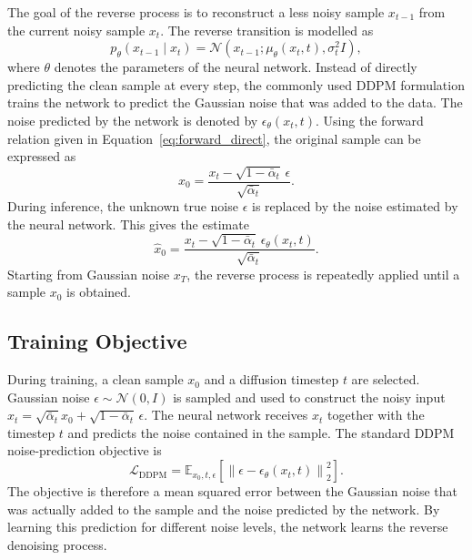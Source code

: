 \documentclass[english,ba]{tudo-sse-thesis}
\begin{document}
The goal of the reverse process is to reconstruct a less noisy sample
\(x_{t-1}\) from the current noisy sample \(x_t\). The reverse transition
is modelled as
\begin{equation}
    p_{\theta}(x_{t-1} \mid x_t)
    =
    \mathcal{N}
    \left(
        x_{t-1};
        \mu_{\theta}(x_t,t),
        \sigma_t^2 I
    \right),
\end{equation}
where \(\theta\) denotes the parameters of the neural network.
Instead of directly predicting the clean sample at every step, the
commonly used DDPM formulation trains the network to predict the Gaussian
noise that was added to the data. The noise predicted by the network is denoted by \(\epsilon_{\theta}(x_t,t)\). Using the forward relation given in
Equation~\ref{eq:forward_direct}, the original sample can be expressed as
\begin{equation}
    x_0
    =
    \frac{
        x_t
        -
        \sqrt{1-\bar{\alpha}_t}\,\epsilon
    }{
        \sqrt{\bar{\alpha}_t}
    }.
\end{equation}
During inference, the unknown true noise \(\epsilon\) is replaced by the
noise estimated by the neural network. This gives the estimate
\begin{equation}
    \hat{x}_0
    =
    \frac{
        x_t
        -
        \sqrt{1-\bar{\alpha}_t}
        \,\epsilon_{\theta}(x_t,t)
    }{
        \sqrt{\bar{\alpha}_t}
    }.
\end{equation}
Starting from Gaussian noise \(x_T\), the reverse process is repeatedly
applied until a sample \(x_0\) is obtained.

\subsection{Training Objective}

During training, a clean sample \(x_0\) and a diffusion timestep \(t\)
are selected. Gaussian noise \(\epsilon \sim \mathcal{N}(0,I)\) is sampled and used to construct the noisy input \(x_t = \sqrt{\bar{\alpha}_t}x_0 + \sqrt{1-\bar{\alpha}_t}\,\epsilon\).
The neural network receives \(x_t\) together with the timestep \(t\) and
predicts the noise contained in the sample. The standard DDPM
noise-prediction objective is
\begin{equation}
    \mathcal{L}_{\mathrm{DDPM}}
    =
    \mathbb{E}_{x_0,t,\epsilon}
    \left[
        \left\|
            \epsilon
            -
            \epsilon_{\theta}(x_t,t)
        \right\|_2^2
    \right].
\end{equation}
The objective is therefore a mean squared error between the Gaussian
noise that was actually added to the sample and the noise predicted by
the network. By learning this prediction for different noise levels, the
network learns the reverse denoising process.
\end{document}

